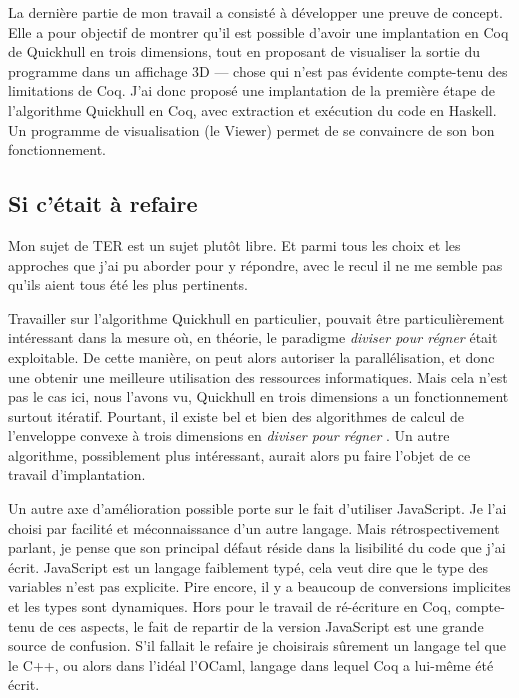 \documentclass[]{article}
\begin{document}
La dernière partie de mon travail a consisté à développer une preuve de concept. Elle a pour objectif de montrer qu'il est possible d'avoir une implantation en Coq de Quickhull en trois dimensions, tout en proposant de visualiser la sortie du programme dans un affichage 3D — chose qui n'est pas évidente compte-tenu des limitations de Coq. J'ai donc proposé une implantation de la première étape de l'algorithme Quickhull en Coq, avec extraction et exécution du code en Haskell. Un programme de visualisation (le Viewer) permet de se convaincre de son bon fonctionnement.

\subsection{Si c'était à refaire}
Mon sujet de TER est un sujet plutôt libre. Et parmi tous les choix et les approches que j'ai pu aborder pour y répondre, avec le recul il ne me semble pas qu'ils aient tous été les plus pertinents.

Travailler sur l'algorithme Quickhull en particulier, pouvait être particulièrement intéressant dans la mesure où, en théorie, le paradigme \emph{diviser pour régner} était exploitable. De cette manière, on peut alors autoriser la parallélisation, et donc une obtenir une meilleure utilisation des ressources informatiques. Mais cela n'est pas le cas ici, nous l'avons vu, Quickhull en trois dimensions a un fonctionnement surtout itératif. Pourtant, il existe bel et bien des algorithmes de calcul de l'enveloppe convexe à trois dimensions en \emph{diviser pour régner} \cite{https://doi.org/10.48550/arxiv.1205.1171}. Un autre algorithme, possiblement plus intéressant, aurait alors pu faire l'objet de ce travail d'implantation.

Un autre axe d'amélioration possible porte sur le fait d'utiliser JavaScript. Je l'ai choisi par facilité et méconnaissance d'un autre langage. Mais rétrospectivement parlant, je pense que son principal défaut réside dans la lisibilité du code que j'ai écrit. JavaScript est un langage faiblement typé, cela veut dire que le type des variables n'est pas explicite. Pire encore, il y a beaucoup de conversions implicites et les types sont dynamiques. Hors pour le travail de ré-écriture en Coq, compte-tenu de ces aspects, le fait de repartir de la version JavaScript est une grande source de confusion. S'il fallait le refaire je choisirais sûrement un langage tel que le C++, ou alors dans l'idéal l'OCaml, langage dans lequel Coq a lui-même été écrit.
\end{document}
